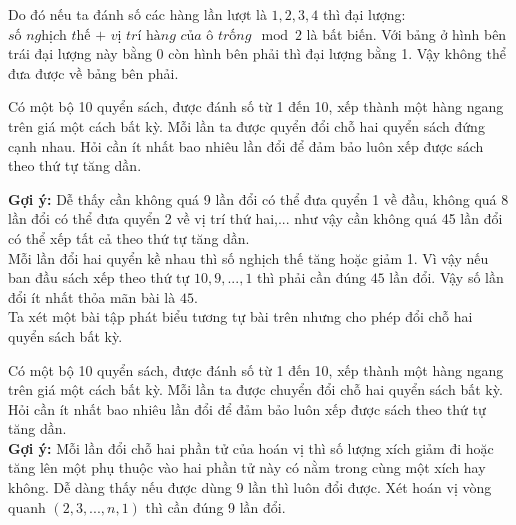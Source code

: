 Do đó nếu ta đánh số các hàng lần lượt là $1,2,3,4$ thì đại lượng:\\
$\textit{số nghịch thế + vị trí hàng của ô trống} \mod 2$ là bất biến. Với bảng ở hình bên trái đại lượng này bằng 0 còn hình bên phải thì đại lượng bằng 1. Vậy không thể đưa được về bảng bên phải.
\begin{bt}
	Có một bộ 10 quyển sách, được đánh số từ 1 đến 10, xếp thành một hàng ngang trên giá một cách bất kỳ. Mỗi lần ta được quyển đổi chỗ hai quyển sách đứng cạnh nhau. Hỏi cần ít nhất bao nhiêu lần đổi để đảm bảo luôn xếp được sách theo thứ tự tăng dần.
	
\end{bt}
\textbf{Gợi ý:} Dễ thấy cần không quá 9 lần đổi có thể đưa quyển 1 về đầu, không quá 8 lần đổi có thể đưa quyển 2 về vị trí thứ hai,... như vậy cần không quá 45 lần đổi có thể xếp tất cả theo thứ tự tăng dần.\\
Mỗi lần đổi hai quyển kề nhau thì số nghịch thế tăng hoặc giảm 1. Vì vậy nếu ban đầu sách xếp theo thứ tự $10,9,...,1$ thì phải cần đúng $45$ lần đổi. Vậy số lần đổi ít nhất thỏa mãn bài là $45$.\\
Ta xét một bài tập phát biểu tương tự bài trên nhưng cho phép đổi chỗ hai quyển sách bất kỳ.
\begin{bt}
	Có một bộ 10 quyển sách, được đánh số từ 1 đến 10, xếp thành một hàng ngang trên giá một cách bất kỳ. Mỗi lần ta được chuyển đổi chỗ hai quyển sách bất kỳ. Hỏi cần ít nhất bao nhiêu lần đổi để đảm bảo luôn xếp được sách theo thứ tự tăng dần.\\
	\textbf{Gợi ý: }Mỗi lần đổi chỗ hai phần tử của hoán vị thì số lượng xích giảm đi hoặc tăng lên một phụ thuộc vào hai phần tử này có nằm trong cùng một xích hay không. Dễ dàng thấy nếu được dùng 9 lần thì luôn đổi được. Xét hoán vị vòng quanh $(2,3,...,n,1)$ thì cần đúng 9 lần đổi.
\end{bt}
